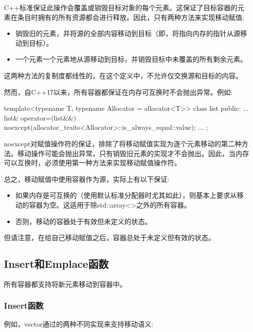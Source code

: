 C++标准保证此操作会覆盖或销毁目标对象的每个元素。这保证了目标容器的元素在条目时拥有的所有资源都会进行释放。因此，只有两种方法来实现移动赋值:

\begin{itemize}
	\item 销毁旧的元素，并将源的全部内容移动到目标（即，将指向内存的指针从源移动到目标）。
	\item 一个元素一个元素地从源移动到目标，并销毁目标中未覆盖的所有剩余元素。
\end{itemize}

这两种方法的复制度都线性的，在这个定义中，不允许仅交换源和目标的内容。

然而，自C++17以来，所有容器都保证在内存可互换时不会抛出异常。例如:

\begin{cppcode}
template<typename T, typename Allocator = allocator<T>>
class list {
public:
	...
	list& operator=(list&&)
	noexcept(allocator_traits<Allocator>::is_always_equal::value);
	...
};
\end{cppcode}

noexcept对赋值操作符的保证，排除了将移动赋值实现为逐个元素移动的第二种方法。移动操作可能会抛出异常，只有销毁旧元素的实现才不会抛出。因此，当内存可以互换时，必须使用第一种方法来实现移动赋值操作符。

总之，移动赋值中使用容器作为源，实际上有以下保证:

\begin{itemize}
	\item 如果内存是可互换的（使用默认标准分配器时尤其如此），则基本上要求从移动的容器为空。这适用于除std::array<>之外的所有容器。
	\item 否则，移动的容器处于有效但未定义的状态。
\end{itemize}

但请注意，在给自己移动赋值之后，容器总处于未定义但有效的状态。

\subsection{Insert和Emplace函数}

所有容器都支持将新元素移动到容器中。

\subsubsection{Insert函数}

例如，vector通过的两种不同实现来支持移动语义:

